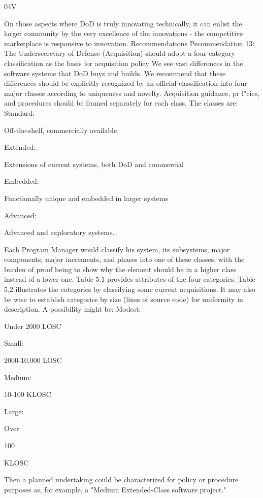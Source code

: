 \documentclass[12pt]{article}
\begin{document}
04V

On those aspects where DoD is truly innovating technically, it can enlist the larger
community by the very excellence of the innovations - the competitive marketplace is
responsive to innovation.
Recommendations
Pecommendation 13: The Undersecretary of Defense (Acquisition) should
adopt a four-category classification as the basis for acquisition policy
We see vast differences in the software systems that DoD buys and builds. We
recommend that these differences should be explicitly recognized by an official classification
into four major classes according to uniqueness and novelty. Acquisition guidance, pr l"cies,
and procedures should be framed separately for each class. The classes are:
Standard:

Off-the-shelf, commercially available

Extended:

Extensions of current systems, both DoD and commercial

Embedded:

Functionally unique and embedded in larger systems

Advanced:

Advanced and exploratory systems.

Each Program Manager would classify his system, its subsystems, major components,
major increments, and phases into one of these classes, with the burden of proof being to
show why the element should be in a higher class instead of a lower one.
Table 5.1 provides attributes of the four categories. Table 5.2 illustrates the categories
by classifying some current acquisitions.
It may also be wise to establish categories by size (lines of source code) for uniformity
in description. A possibility might be:
Modest:

Under 2000 LOSC

Small:

2000-10,000 LOSC

Medium:

10-100 KLOSC

Large:

Over

100

KLOSC

Then a planned undertaking could be characterized for policy or procedure purposes
as, for example, a "Medium Extended-Class software project."
\end{document}
